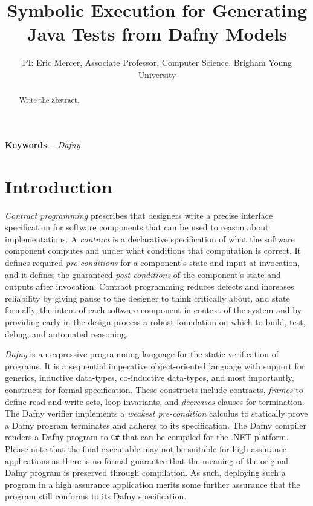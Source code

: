 \documentclass[11pt,onecolumn,notitlepage]{article}
\begin{document}
\title{Symbolic Execution for Generating Java Tests from Dafny Models}
\author{PI: Eric Mercer, Associate Professor, Computer Science, Brigham Young University}
\maketitle

\begin{abstract}
  Write the abstract.
\end{abstract}

\providecommand{\keywords}[1]{\noindent\textbf{Keywords -- } \textit{#1}}
\keywords{Dafny}

\section*{Introduction}
\emph{Contract programming} prescribes that designers write a precise interface specification for software components that can be used to reason about implementations. A \emph{contract} is a declarative specification of what the software component computes and under what conditions that computation is correct. It defines required \emph{pre-conditions} for a component's state and input at invocation, and it defines the guaranteed \emph{post-conditions} of the component's state and outputs after invocation. Contract programming reduces defects and increases reliability by giving pause to the designer to think critically about, and state formally, the intent of each software component in context of the system and by providing early in the design process a robust foundation on which to build, test, debug, and automated reasoning. 

\emph{Dafny} is an expressive programming language for the static verification of programs. It is a sequential imperative object-oriented language with support for generics, inductive data-types, co-inductive data-types, and most importantly, constructs for formal specification. These constructs include contracts, \emph{frames} to define read and write sets, loop-invariants, and \emph{decreases} clauses for termination. The Dafny verifier implements a \emph{weakest pre-condition} calculus to statically prove a Dafny program terminates and adheres to its specification. The Dafny compiler renders a Dafny program to \texttt{C\#} that can be compiled for the .NET platform. Please note that the final executable may not be suitable for high assurance applications as there is no formal guarantee that the meaning of the original Dafny program is preserved through compilation. As such, deploying such a program in a high assurance application merits some further assurance that the program still conforms to its Dafny specification.  
\end{document}
